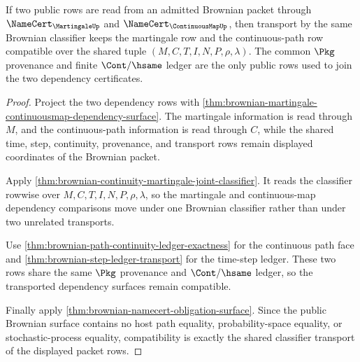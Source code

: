 \begin{theorem}
\label{thm:brownian-continuity-martingale-compatibility}
If two public rows are read from an admitted Brownian packet through
$\NameCert_{\MartingaleUp}$ and $\NameCert_{\ContinuousMapUp}$, then transport
by the same Brownian classifier keeps the martingale row and the continuous-path
row compatible over the shared tuple $(M,C,T,I,N,P,\rho,\lambda)$. The common
$\Pkg$ provenance and finite $\Cont/\hsame$ ledger are the only public rows used
to join the two dependency certificates.
\end{theorem}
\begin{proof}
Project the two dependency rows with
\autoref{thm:brownian-martingale-continuousmap-dependency-surface}. The
martingale information is read through $M$, and the continuous-path information
is read through $C$, while the shared time, step, continuity, provenance, and
transport rows remain displayed coordinates of the Brownian packet.

Apply \autoref{thm:brownian-continuity-martingale-joint-classifier}. It reads
the classifier rowwise over $M,C,T,I,N,P,\rho,\lambda$, so the martingale and
continuous-map dependency comparisons move under one Brownian classifier rather
than under two unrelated transports.

Use \autoref{thm:brownian-path-continuity-ledger-exactness} for the continuous
path face and \autoref{thm:brownian-step-ledger-transport} for the time-step
ledger. These two rows share the same $\Pkg$ provenance and $\Cont/\hsame$
ledger, so the transported dependency surfaces remain compatible.

Finally apply \autoref{thm:brownian-namecert-obligation-surface}. Since the
public Brownian surface contains no host path equality, probability-space
equality, or stochastic-process equality, compatibility is exactly the shared
classifier transport of the displayed packet rows.
\end{proof}

